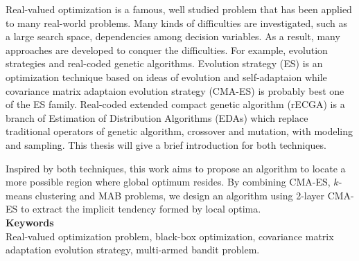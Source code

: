 \begin{abstractEN}

\setlength{\baselineskip}{1.5em} 


Real-valued optimization is a famous, well studied problem that has been
applied to many real-world problems.
Many kinds of difficulties are investigated, such as a large search
space, dependencies among decision variables.
As a result, many approaches are developed to conquer the difficulties.
For example, evolution strategies and real-coded genetic algorithms.
Evolution strategy (ES) is an optimization technique based on ideas of
evolution and self-adaptaion while covariance matrix adaptaion evolution
strategy (CMA-ES) is probably best one of the ES family.
Real-coded extended compact genetic algorithm (rECGA) is a branch of
Estimation of Distribution Algorithms (EDAs) which replace traditional
operators of genetic algorithm, crossover and mutation, with modeling
and sampling.
This thesis will give a brief introduction for both techniques.

Inspired by both techniques, this work aims to propose an algorithm to
locate a more possible region where global optimum resides.
By combining CMA-ES, $k$-means clustering and MAB problems, we design an
algorithm using 2-layer CMA-ES to extract the implicit tendency formed
by local optima.
\\

\noindent
\textbf{Keywords} \\
\noindent
Real-valued optimization problem, black-box optimization, covariance matrix adaptation evolution
strategy, multi-armed bandit problem.

\end{abstractEN}
